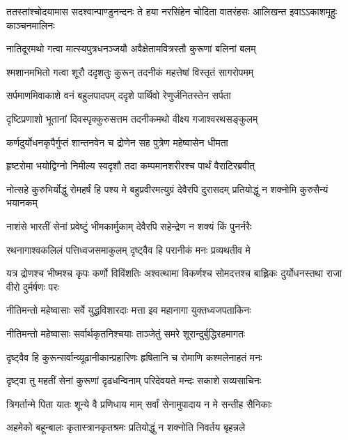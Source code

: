 \onelineshloka
{ततस्तांश्चोदयामास सदश्वान्पाण्डुनन्दनः}
\twolineshloka
{ते हया नरसिंहेन चोदिता वातरंहसः}
{आलिखन्त इवाऽऽकाशमूहुः काञ्चनमालिनः}


\twolineshloka
{नातिदूरमथो गत्वा मात्स्यपुत्रधनञ्जयौ}
{अवैक्षेतामवित्रस्तौ कुरूणां बलिनां बलम्}


\twolineshloka
{श्मशानमभितो गत्वा शूरौ ददृशतुः कुरून्}
{तदनीकं महत्तेषां विस्तृतं सागरोपमम्}


\twolineshloka
{सर्पमाणमिवाकाशे वनं बहुलपादपम्}
{ददृशे पार्थिवो रेणुर्जनितस्तेन सर्पता}


\twolineshloka
{दृष्टिप्रणाशो भूतानां दिवस्पृक्कुरुसत्तम}
{तदनीकमथो वीक्ष्य गजाश्वरथसङ्कुलम्}


\twolineshloka
{कर्णदुर्योधनकृपैर्गुप्तं शान्तनवेन च}
{द्रोणेन सह पुत्रेण महेष्वासेन धीमता}


\twolineshloka
{हृष्टरोमा भयोद्विग्नो निमील्य स्वदृशौ तदा}
{कम्पमानशरीरश्च पार्थं वैराटिरब्रवीत्}


\threelineshloka
{नोत्सहे कुरुभिर्योद्धुं रोमहर्षं हि पश्य मे}
{बहुप्रवीरमत्युग्रं देवैरपि दुरासदम्}
{प्रतियोद्धुं न शक्नोमि कुरुसैन्यं भयानकम्}


\twolineshloka
{नाशंसे भारतीं सेनां प्रवेष्टुं भीमकार्मुकाम्}
{देवैरपि सहेन्द्रेण न शक्यं किं पुनर्नरैः}


\twolineshloka
{रथनागाश्वकलिलं पत्तिध्वजसमाकुलम्}
{दृष्ट्वैव हि परानीकं मनः प्रव्यथतीव मे}


\threelineshloka
{यत्र द्रोणश्च भीष्मश्च कृपः कर्णो विविंशतिः}
{अश्वत्थामा विकर्णश्च सोमदत्तश्च बाह्लिकः}
{दुर्योधनस्तथा राजा वीरो दुर्मर्षणः परः}


\twolineshloka
{नीतिमन्तो महेष्वासाः सर्वे युद्धविशारदाः}
{मत्ता इव महानागा युक्तध्वजपताकिनः}


\twolineshloka
{नीतिमन्तो महेष्वासाः सर्वार्थकृतनिश्चयाः}
{ताञ्जेतुं समरे शूरान्दुर्बुद्धिरहमागतः}


\twolineshloka
{दृष्ट्वैव हि कुरून्सर्वान्व्यूढानीकान्प्रहारिणः}
{हृषितानि च रोमाणि कश्मलेनाहतं मनः}



\twolineshloka
{दृष्ट्वा तु महतीं सेनां कुरूणां दृढधन्विनाम्}
{परिदेवयते मन्दः सकाशे सव्यसाचिनः}


\twolineshloka
{त्रिगर्तान्मे पिता यातः शून्ये वै प्रणिधाय माम्}
{सर्वां सेनामुपादाय न मे सन्तीह सैनिकाः}


\twolineshloka
{अहमेको बहून्बालः कृतास्त्रानकृतश्रमः}
{प्रतियोद्धुं न शक्नोति निवर्तय बृहन्नले}



